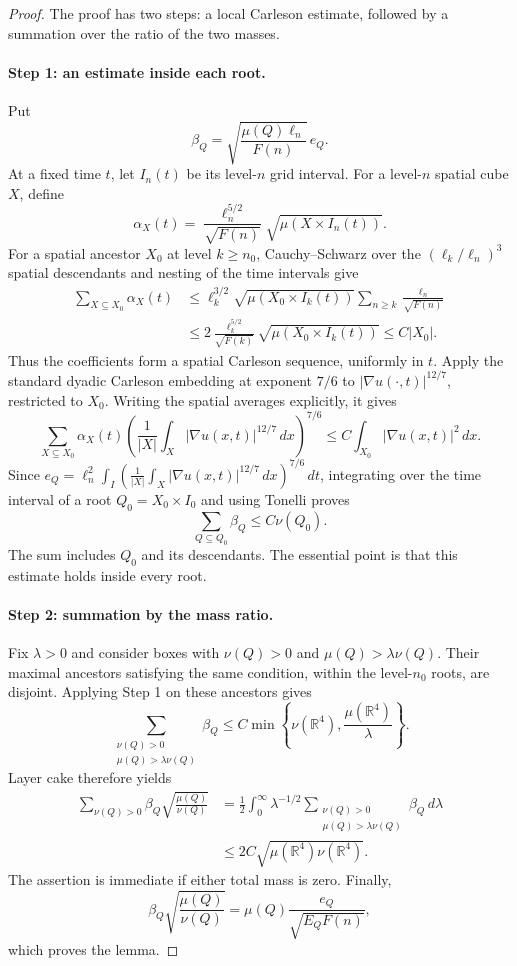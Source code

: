 \documentclass[11pt]{article}
\newcommand{\R}{\mathbb R}
\begin{document}
\begin{proof}
The proof has two steps: a local Carleson estimate, followed by a
summation over the ratio of the two masses.

\paragraph{Step 1: an estimate inside each root.}
Put
$$
\beta_Q=\sqrt{\frac{\mu(Q)\ell_n}{F(n)}}\,e_Q.
$$
At a fixed time \(t\), let \(I_n(t)\) be its level-\(n\) grid interval.
For a level-\(n\) spatial cube \(X\), define
$$
\alpha_X(t)=\frac{\ell_n^{5/2}}{\sqrt{F(n)}}
                 \sqrt{\mu(X\times I_n(t))}.
$$
For a spatial ancestor \(X_0\) at level \(k\geq n_0\),
Cauchy--Schwarz over the \((\ell_k/\ell_n)^3\) spatial descendants
and nesting of the time intervals give
$$
\begin{aligned}
\sum_{X\subseteq X_0}\alpha_X(t)
&\leq\ell_k^{3/2}\sqrt{\mu(X_0\times I_k(t))}
          \sum_{n\geq k}\frac{\ell_n}{\sqrt{F(n)}}\\
&\leq2\frac{\ell_k^{5/2}}{\sqrt{F(k)}}
            \sqrt{\mu(X_0\times I_k(t))}
\leq C|X_0|.
\end{aligned}
$$
Thus the coefficients form a spatial Carleson sequence, uniformly in
\(t\). Apply the standard dyadic Carleson embedding at exponent
\(7/6\) to \(|\nabla u(\cdot,t)|^{12/7}\), restricted to \(X_0\).
Writing the spatial averages explicitly, it gives
$$
\sum_{X\subseteq X_0}\alpha_X(t)
  \left(\frac1{|X|}\int_X|\nabla u(x,t)|^{12/7}\,dx\right)^{7/6}
\leq C\int_{X_0}|\nabla u(x,t)|^2\,dx.
$$
Since
\(e_Q=\ell_n^2\int_I
\left(\frac1{|X|}\int_X|\nabla u(x,t)|^{12/7}\,dx\right)^{7/6}\,dt\),
integrating over the time interval of a root \(Q_0=X_0\times I_0\)
and using Tonelli proves
$$
\sum_{Q\subseteq Q_0}\beta_Q\leq C\nu(Q_0).
$$
The sum includes \(Q_0\) and its descendants. The essential point is
that this estimate holds inside every root.

\paragraph{Step 2: summation by the mass ratio.}
Fix \(\lambda>0\) and consider boxes with \(\nu(Q)>0\) and
\(\mu(Q)>\lambda\nu(Q)\). Their maximal ancestors satisfying the
same condition, within the level-\(n_0\) roots, are disjoint.
Applying Step 1 on these ancestors gives
$$
\sum_{\substack{\nu(Q)>0\\\mu(Q)>\lambda\nu(Q)}}\beta_Q
\leq C\min\left\{\nu(\R^4),\frac{\mu(\R^4)}{\lambda}\right\}.
$$
Layer cake therefore yields
$$
\begin{aligned}
\sum_{\nu(Q)>0}\beta_Q\sqrt{\frac{\mu(Q)}{\nu(Q)}}
&=\frac12\int_0^\infty\lambda^{-1/2}
 \sum_{\substack{\nu(Q)>0\\\mu(Q)>\lambda\nu(Q)}}\beta_Q\,d\lambda\\
&\leq2C\sqrt{\mu(\R^4)\nu(\R^4)}.
\end{aligned}
$$
The assertion is immediate if either total mass is zero. Finally,
$$
\beta_Q\sqrt{\frac{\mu(Q)}{\nu(Q)}}
=\mu(Q)\frac{e_Q}{\sqrt{E_QF(n)}},
$$
which proves the lemma.
\end{proof}
\end{document}
